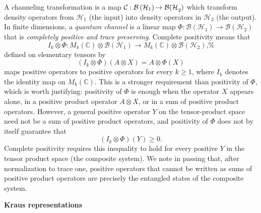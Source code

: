 \documentclass[12pt]{amsart}
\theoremstyle{plain}
\theoremstyle{definition}
\theoremstyle{remark}
\numberwithin{equation}{section}
\newcommand{\1}{\mathbf 1}
\begin{document}
A channeling transformation is a map $\mathcal{C}:\mathcal{B}\left( \mathcal{%
H}_{1}\right) \mathcal{\rightarrow B(H}_{2}\mathcal{)}$ which transform
density operators from $\mathcal{H}_{1}$ (the input) into density operators
in $\mathcal{H}_{2}$ (the output). In finite dimensions, a \emph{quantum
channel} is a linear map $\Phi :\mathcal{B}(\mathcal{H}_{1})\rightarrow 
\mathcal{B}(\mathcal{H}_{2})$ that is \emph{completely positive and trace
preserving}. Complete positivity means that 
\begin{equation*}
I_{k}\otimes \Phi :M_{k}(\mathbb{C})\otimes \mathcal{B}(\mathcal{H}%
_{1})\rightarrow M_{k}(\mathbb{C})\otimes \mathcal{B}(\mathcal{H}_{2})\text{,%
}
\end{equation*}%
defined on elementary tensors by%
\begin{equation*}
(I_{k}\otimes \Phi )(A\otimes X)=A\otimes \Phi (X)
\end{equation*}%
maps positive operators to positive operators for every $k\geq 1$, where $%
I_{k}$ denotes the identity map on $M_{k}(\mathbb{C})$. This is a stronger
requirement than positivity of $\Phi $, which is worth justifying:
positivity of $\Phi $ is enough when the operator $X$ appears alone, in a
positive product operator $A\otimes X$, or in a sum of positive product
operators. However, a general positive operator $Y$ on the tensor-product
space need not be a sum of positive product operators, and positivity of $%
\Phi $ does not by itself guarantee that%
\begin{equation*}
\left( I_{k}\otimes \Phi \right) \left( Y\right) \geq 0.
\end{equation*}%
Complete positivity requires this inequality to hold for every positive $Y$
in the tensor product space (the composite system). We note in passing that,
after normalization to trace one, positive operators that cannot be written
as sums of positive product operators are precisely the entangled states of
the composite system.

\textbf{Kraus representations}
\end{document}

